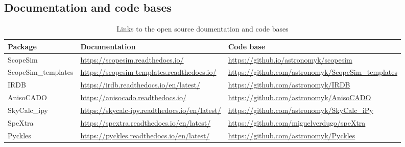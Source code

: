 \subsection{Documentation and code bases%
  \label{documentation-and-code-bases}%
}

\setlength{\DUtablewidth}{\linewidth}
\begin{longtable}[c]{|p{0.315\DUtablewidth}|p{0.315\DUtablewidth}|p{0.315\DUtablewidth}|}
\caption{Links to the open source doumentation and code bases}\\
\hline

Package
 & 
Documentation
 & 
Code base
 \\
\hline

ScopeSim
 & 
\url{https://scopesim.readthedocs.io/}
 & 
\url{https://github.io/astronomyk/scopesim}
 \\
\hline

ScopeSim\_templates
 & 
\url{https://scopesim-templates.readthedocs.io/}
 & 
\url{https://github.com/astronomyk/ScopeSim_templates}
 \\
\hline

IRDB
 & 
\url{https://irdb.readthedocs.io/en/latest/}
 & 
\url{https://github.com/astronomyk/IRDB}
 \\
\hline

AnisoCADO
 & 
\url{https://anisocado.readthedocs.io/}
 & 
\url{https://github.com/astronomyk/AnisoCADO}
 \\
\hline

SkyCalc\_ipy
 & 
\url{https://skycalc-ipy.readthedocs.io/en/latest/}
 & 
\url{https://github.com/astronomyk/SkyCalc_iPy}
 \\
\hline

SpeXtra
 & 
\url{https://spextra.readthedocs.io/en/latest/}
 & 
\url{https://github.com/miguelverdugo/speXtra}
 \\
\hline

Pyckles
 & 
\url{https://pyckles.readthedocs.io/en/latest/}
 & 
\url{https://github.com/astronomyk/Pyckles}
 \\
\hline
\end{longtable}
\label{tbl-list-of-packages}
